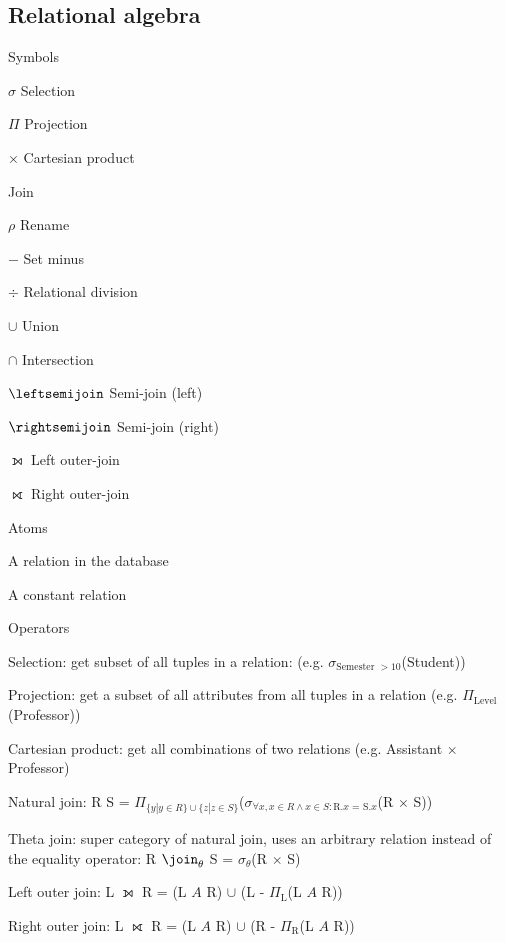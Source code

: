 \subsection{Relational algebra}
\enumstart
	\item Symbols
	\enumstart
		\item $\sigma$ Selection
		\item $\Pi$ Projection
		\item $\times$ Cartesian product
		\item \join Join
		\item $\rho$ Rename
		\item $-$ Set minus
		\item $\div$ Relational division
		\item $\cup$ Union
		\item $\cap$ Intersection
		\item $\leftsemijoin$ Semi-join (left)
		\item $\rightsemijoin$ Semi-join (right)
		\item $\leftouterjoin$ Left outer-join
		\item $\rightouterjoin$ Right outer-join
	\enumend
	\item Atoms
	\enumstart
		\item A relation in the database
		\item A constant relation
	\enumend
	\item Operators
	\enumstart
		\item Selection: get subset of all tuples in a relation: (e.g. $\sigma_{\text{Semester }> 10}$(Student))
		\item Projection: get a subset of all attributes from all tuples in a relation (e.g. $\Pi_{\text{Level}}$(Professor))
		\item Cartesian product: get all combinations of two relations (e.g. Assistant $\times$ Professor)
		\item Natural join: R \join S = $\Pi_{\{y|y \in R\}\cup\{z|z \in S\}}$($\sigma_{\forall x,x \in R \land x \in S: \text{R.$x$ = S.$x$}}$(R $\times$ S))
		\item Theta join: super category of natural join, uses an arbitrary relation instead of the equality operator: R $\join_\theta$ S = $\sigma_{\theta}$(R $\times$ S)
		\item Left outer join: L $\leftouterjoin$ R = (L $A$ R) $\cup$ (L - $\Pi_{\text{L}}$(L $A$ R))
		\item Right outer join: L $\rightouterjoin$ R = (L $A$ R) $\cup$ (R - $\Pi_{\text{R}}$(L $A$ R))
